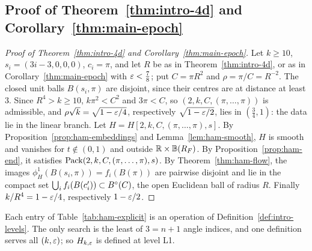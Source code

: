 \subsection{Proof of Theorem~\texorpdfstring{\ref{thm:intro-4d}}{A} and Corollary~\texorpdfstring{\ref{thm:main-epoch}}{C}}\label{sec:ham-proof-main}

\begin{proof}[Proof of Theorem~\ref{thm:intro-4d} and Corollary~\ref{thm:main-epoch}]
Let $k\ge10$, $s_i=(3i-3,0,0,0)$, $c_i=\pi$, and let $R$ be as in Theorem~\ref{thm:intro-4d}, or as in
Corollary~\ref{thm:main-epoch} with $\varepsilon<\frac78$; put $C=\pi R^2$ and $\rho=\pi/C=R^{-2}$. The closed unit balls
$B(s_i,\pi)$ are disjoint, since their centres are at distance at least $3$. Since $R^4>k\ge10$, $k\pi^2<C^2$ and
$3\pi<C$, so $(2,k,C,(\pi,\dots,\pi))$ is admissible, and $\rho\sqrt k=\sqrt{1-\varepsilon/4}$, respectively
$\sqrt{1-\varepsilon/2}$, lies in $(\frac34,1)$: the data lie in the linear branch. Let $H=H[2,k,C,(\pi,\dots,\pi),s]$. By
Proposition~\ref{prop:ham-embeddings} and Lemma~\ref{lem:ham-smooth}, $H$ is smooth and vanishes for $t\notin(0,1)$
and outside $\mathbb{R}\times\mathbb{B}(R_F)$. By Proposition~\ref{prop:ham-end}, it satisfies $\mathrm{Pack}(2,k,C,(\pi,\dots,\pi),s)$. By
Theorem~\ref{thm:ham-flow}, the images $\phi^1_H(B(s_i,\pi))=f_i(B(\pi))$ are pairwise disjoint and lie in the
compact set $\bigcup_if_i(B(c'_i))\subset B^{\circ}(C)$, the open Euclidean ball of radius $R$. Finally $k/R^4=1-\varepsilon/4$,
respectively $1-\varepsilon/2$.
\end{proof}

Each entry of Table~\ref{tab:ham-explicit} is an operation of Definition~\ref{def:intro-levels}. The only search is
the least of $3=n+1$ angle indices, and one definition serves all $(k,\varepsilon)$; so $H_{k,\varepsilon}$ is defined at level L1.

